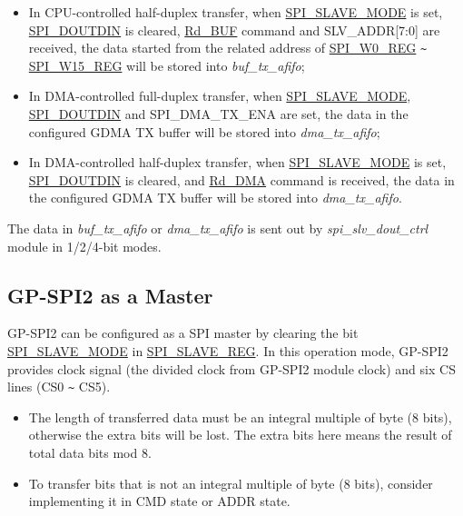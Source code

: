 \documentclass[main\_\_EN.tex]{subfiles}
\begin{document}
\begin{itemize}
\begin{itemize}
        \item In CPU-controlled half-duplex transfer, when \hyperref[fielddesc:SPISLAVEMODE]{SPI\_SLAVE\_MODE} is set, \hyperref[fielddesc:SPIDOUTDIN]{SPI\_DOUTDIN} is cleared, \hyperref[cmd:rdbuf]{Rd\_BUF} command and SLV\_ADDR[7:0] are received, the data started from the related address of \hyperref[regdesc:SPIW0REG]{SPI\_W0\_REG} \verb+~+ \hyperref[regdesc:SPIW0REG]{SPI\_W15\_REG} will be stored into \emph{buf\_tx\_afifo};

        \item In DMA-controlled full-duplex transfer, when \hyperref[fielddesc:SPISLAVEMODE]{SPI\_SLAVE\_MODE}, \hyperref[fielddesc:SPIDOUTDIN]{SPI\_DOUTDIN} and SPI\_DMA\_TX\_ENA are set, the data in the configured GDMA TX buffer will be stored into \emph{dma\_tx\_afifo};

        \item In DMA-controlled half-duplex transfer, when \hyperref[fielddesc:SPISLAVEMODE]{SPI\_SLAVE\_MODE} is set, \hyperref[fielddesc:SPIDOUTDIN]{SPI\_DOUTDIN} is cleared, and \hyperref[cmd:rddma]{Rd\_DMA} command is received, the data in the configured GDMA TX buffer will be stored into \emph{dma\_tx\_afifo}.

    \end{itemize}

The data in \emph{buf\_tx\_afifo} or \emph{dma\_tx\_afifo} is sent out by \emph{spi\_slv\_dout\_ctrl} module in 1/2/4-bit modes.
\end{itemize}

\subsection{GP-SPI2 as a Master}\label{sec:spi-master-mode}

GP-SPI2 can be configured as a SPI master by clearing the bit \hyperref[fielddesc:SPISLAVEMODE]{SPI\_SLAVE\_MODE} in \hyperref[regdesc:SPISLAVEREG]{SPI\_SLAVE\_REG}. In this operation mode, GP-SPI2 provides clock signal (the divided clock from GP-SPI2 module clock) and six CS lines (CS0 \verb+~+ CS5).

\begin{tiplisting}
\vspace{-2em}
\begin{itemize}
    \item The length of transferred data must be an integral multiple of byte (8 bits), otherwise the extra bits will be lost. The extra bits here means the result of total data bits mod 8.
    \item To transfer bits that is not an integral multiple of byte (8 bits), consider implementing it in CMD state or ADDR state.
\end{itemize}
\end{tiplisting}
\end{document}
